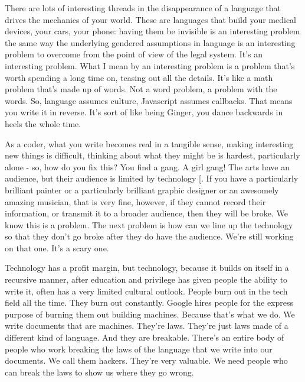 There are lots of interesting threads in the disappearance of a language that drives the mechanics of your world. These are languages that build your medical devices, your cars, your phone: having them be invisible is an interesting problem the same way the underlying gendered assumptions in language is an interesting problem to overcome from the point of view of the legal system. It's an interesting problem. What I mean by an interesting problem is a problem that's worth spending a long time on, teasing out all the details. It's like a math problem that's made up of words. Not a word problem, a problem with the words. So, language assumes culture, Javascript assumes callbacks. That means you write it in reverse. It's sort of like being Ginger, you dance backwards in heels the whole time.

As a coder, what you write becomes real in a tangible sense, making interesting new things is difficult, thinking about what they might be is hardest, particularly alone - so, how do you fix this? You find a gang. A girl gang! The arts have an audience, but their audience is limited by technology [\cite{LISA notes}. If you have a particularly brilliant painter or a particularly brilliant graphic designer or an awesomely amazing musician, that is very fine, however, if they cannot record their information, or transmit it to a broader audience, then they will be broke. We know this is a problem. The next problem is how can we line up the technology so that they don't go broke after they do have the audience. We're still working on that one. It's a scary one. 

Technology has a profit margin, but technology, because it builds on itself in a recursive manner, after education and privilege has given people the ability to write it, often has a very limited cultural outlook. People burn out in the tech field all the time. They burn out constantly. Google hires people for the express purpose of burning them out building machines. Because that's what we do. We write documents that are machines. They're laws. They're just laws made of a different kind of language. And they are breakable. There's an entire body of people who work breaking the laws of the language that we write into our documents. We call them hackers. They're very valuable. We need people who can break the laws to show us where they go wrong. 

